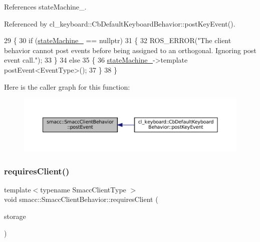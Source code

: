 References state\+Machine\+\_\+.



Referenced by cl\+\_\+keyboard\+::\+Cb\+Default\+Keyboard\+Behavior\+::post\+Key\+Event().


\begin{DoxyCode}
29 \{
30     \textcolor{keywordflow}{if} (\hyperlink{classsmacc_1_1SmaccClientBehavior_a7950b5684d6de0a8e8959c0936ce9a19}{stateMachine\_} == \textcolor{keyword}{nullptr})
31     \{
32         ROS\_ERROR(\textcolor{stringliteral}{"The client behavior cannot post events before being assigned to an orthogonal. Ignoring
       post event call."});
33     \}
34     \textcolor{keywordflow}{else}
35     \{
36         \hyperlink{classsmacc_1_1SmaccClientBehavior_a7950b5684d6de0a8e8959c0936ce9a19}{stateMachine\_}->template postEvent<EventType>();
37     \}
38 \}
\end{DoxyCode}
Here is the caller graph for this function\+:
\nopagebreak
\begin{figure}[H]
\begin{center}
\leavevmode
\includegraphics[width=350pt]{classsmacc_1_1SmaccClientBehavior_a3152cd2215ebc0e387a8a546de07cded_icgraph}
\end{center}
\end{figure}
\mbox{\label{classsmacc_1_1SmaccClientBehavior_a917f001e763a1059af337bf4e164f542}} 
\subsubsection{\texorpdfstring{requires\+Client()}{requiresClient()}}
{\footnotesize\ttfamily template$<$typename Smacc\+Client\+Type $>$ \\
void smacc\+::\+Smacc\+Client\+Behavior\+::requires\+Client (\begin{DoxyParamCaption}\item[{Smacc\+Client\+Type $\ast$\&}]{storage }\end{DoxyParamCaption})}



